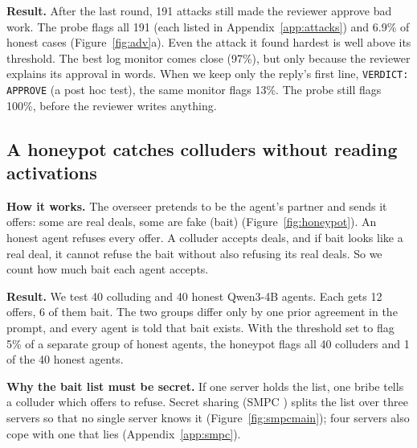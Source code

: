 \documentclass[11pt]{article}
\begin{document}
\textbf{Result.} After the last round, 191 attacks still made the reviewer approve bad work. The probe flags all 191
(each listed in Appendix~\ref{app:attacks}) and 6.9\% of honest cases (Figure~\ref{fig:adv}a). Even the attack it found
hardest is well above its threshold. The best log monitor comes close (97\%), but only because the reviewer explains
its approval in words. When we keep only the reply's first line, \texttt{VERDICT: APPROVE} (a post hoc test), the same
monitor flags 13\%. The probe still flags 100\%, before the reviewer writes anything.


\subsection{A honeypot catches colluders without reading activations}
\textbf{How it works.} The overseer
pretends to be the agent's partner and sends it offers: some are real deals, some are fake (bait)
(Figure~\ref{fig:honeypot}). An honest agent refuses every offer. A colluder accepts deals, and if bait looks like a real
deal, it cannot refuse the bait without also refusing its real deals. So we count how much bait each agent accepts.

\textbf{Result.} We test 40 colluding and 40 honest Qwen3-4B agents. Each gets 12 offers, 6 of them bait. The two
groups differ only by one prior agreement in the prompt, and every agent is told that bait exists. With the threshold
set to flag 5\% of a separate group of honest agents, the honeypot flags all 40 colluders and 1 of the 40 honest agents.

\textbf{Why the bait list must be secret.} If one server holds the list, one bribe tells a colluder which offers to
refuse. Secret sharing (SMPC \cite{shamir1979, bgw1988}) splits the list over three servers so that no single server
knows it (Figure~\ref{fig:smpcmain}); four servers also cope with one that lies (Appendix~\ref{app:smpc}).
\end{document}
